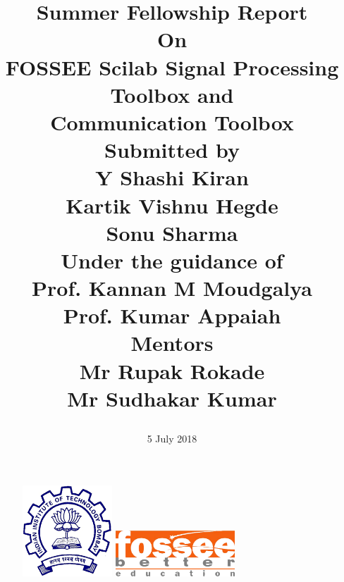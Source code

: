\documentclass[12pt,a4paper]{report}
\begin{document}
\begin{figure}
\centering
\includegraphics[width = 0.3\textwidth]{iit.png}
\hspace{1cm}
\includegraphics[width = 0.4\textwidth]{fossee-logo.png}
\end{figure}

\title{\textbf{\textbf{Summer Fellowship Report}}\vspace{3mm} \\\small On \\\vspace{3mm} \textbf{\large FOSSEE Scilab Signal Processing Toolbox and\\ Communication Toolbox}\vspace{3mm} \\ \vspace{3mm}\small Submitted by\\  \vspace{3mm}  \large \textbf{Y Shashi Kiran}\\ \vspace{2mm}  \large \textbf{Kartik Vishnu Hegde}\\ \vspace{2mm}  \large \textbf{Sonu Sharma}\\ \vspace{7mm}
\small Under the guidance of \\  \vspace{3mm}
\large \textbf{Prof. Kannan M Moudgalya} \vspace{1mm}\\
\large \textbf{Prof. Kumar Appaiah} \vspace{5 mm}\\
\small Mentors
\\ 
\vspace{1mm} \large \textbf{Mr Rupak Rokade}\\ 
\vspace{1mm}  \large \textbf{Mr Sudhakar Kumar}\\
\date{5 July 2018}
}
\end{document}
